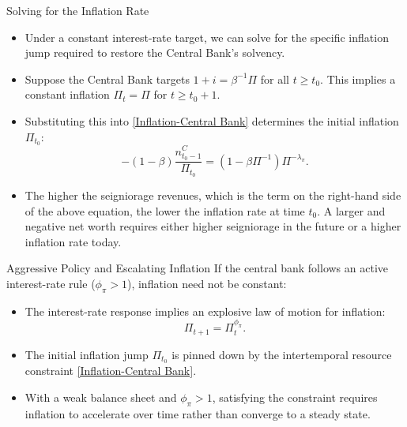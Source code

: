 \documentclass[11pt,aspectratio=169]{beamer}
\begin{document}
\begin{frame}{Solving for the Inflation Rate}
\small


\begin{itemize}
    \item Under a constant interest-rate target, we can solve for the specific inflation jump required to restore the Central Bank's solvency.
    \item Suppose the Central Bank targets $1+i = \beta^{-1}\Pi$ for all $t \geq t_0$. This implies a constant inflation $\Pi_t = \Pi$ for $t \geq t_0+1$.
    \item Substituting this into \eqref{Inflation-Central Bank} determines the initial inflation $\Pi_{t_0}$:
    \begin{equation}
    -(1-\beta )\frac{n_{t_{0}-1}^{C}}{\Pi _{t_{0}}}=\left( 1-\beta \Pi ^{-1}\right) \Pi ^{-\lambda _{\pi }}. \label{Eq.Central BankCentral Bank}
    \end{equation}
    \item The higher the seigniorage revenues, which is the term on the right-hand side of the above equation, the lower the inflation rate at time $t_{0}$. A larger and negative net worth requires either higher seigniorage in the future or a higher inflation rate today.
\end{itemize}
\end{frame}


\begin{frame}{Aggressive Policy and Escalating Inflation}
\small
If the central bank follows an active interest-rate rule (\(\phi_{\pi}>1\)), inflation need not be constant:

\begin{itemize}
    \item The interest-rate response implies an explosive law of motion for inflation:
    \begin{equation}
        \Pi_{t+1} = \Pi_{t}^{\phi_{\pi}}.
        \label{Tight-2}
    \end{equation}
    \item The initial inflation jump \(\Pi_{t_0}\) is pinned down by the intertemporal resource constraint \eqref{Inflation-Central Bank}.
    \item With a weak balance sheet and \(\phi_{\pi}>1\), satisfying the constraint requires inflation to accelerate over time rather than converge to a steady state.
\end{itemize}
\end{frame}
\end{document}
